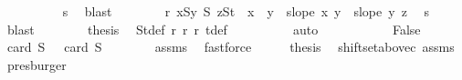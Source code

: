 \begin{isabellebody}
\ \ \ \ \ \ \ \ \isamarkupfalse%
\ s{}\ \isamarkupfalse%
\ blast\isanewline
\ \ \ \ \ \ \isamarkupfalse%
\ r{}{\isacharcolon}{\kern0pt}\ {\isachardoublequoteopen}{\isasymforall}x{\isasymin}S{}{\isachardot}{\kern0pt}{\isasymforall}y{\isasymin}\ S{}{\isachardot}{\kern0pt}\ {\isasymforall}z{\isasymin}S{}t{\isachardot}{\kern0pt}\ \ x\ {\isacharless}{\kern0pt}\ y\ {\isasymlongrightarrow}\ slope\ x\ y\ {\isacharless}{\kern0pt}\ slope\ y\ z{\isachardoublequoteclose}\ \isamarkupfalse%
\ s{}\ \isamarkupfalse%
\ blast\isanewline
\ \ \ \ \ \ \isamarkupfalse%
\ {\isacharquery}{\kern0pt}thesis\ \isamarkupfalse%
\ S{}t{\isacharunderscore}{\kern0pt}def\ r{}\ r{}\ r{}\ t{\isacharunderscore}{\kern0pt}def\isanewline
\ \ \ \ \ \ \ \ \isamarkupfalse%
\ auto\isanewline
\ \ \ \ \isamarkupfalse%
\isanewline
\ \ \isamarkupfalse%
\isanewline
{}\isamarkupfalse%
\isanewline
\ \ \isamarkupfalse%
\ False\isanewline
\ \ \isamarkupfalse%
\ {\isachardoublequoteopen}card\ S{}\ {\isasymge}\ {}{\isachardoublequoteclose}\ {\isachardoublequoteopen}card\ S{}\ {\isasymge}\ {}{\isachardoublequoteclose}\isanewline
\ \ \ \ \isamarkupfalse%
\ assms{\isacharparenleft}{\kern0pt}{}{\isacharcomma}{\kern0pt}{}{\isacharparenright}{\kern0pt}\ \isamarkupfalse%
\ fastforce{\isacharplus}{\kern0pt}\isanewline
\ \ \isamarkupfalse%
\ \isamarkupfalse%
\ {\isacharquery}{\kern0pt}thesis\ \isamarkupfalse%
\ shift{\isacharunderscore}{\kern0pt}set{\isacharunderscore}{\kern0pt}above{\isacharunderscore}{\kern0pt}c{}\ assms\ \isamarkupfalse%
\ presburger\isanewline
{}\isamarkupfalse%
%
\endisatagproof
{\isafoldproof}%
%
\isadelimproof
\isanewline
%
\endisadelimproof
\isanewline
%
\isadelimtheory
\isanewline
%
\endisadelimtheory
%
\isatagtheory
{}\isamarkupfalse%
%
\endisatagtheory
{\isafoldtheory}%
%
\isadelimtheory
%
\endisadelimtheory
%
\end{isabellebody}%
\endinput

